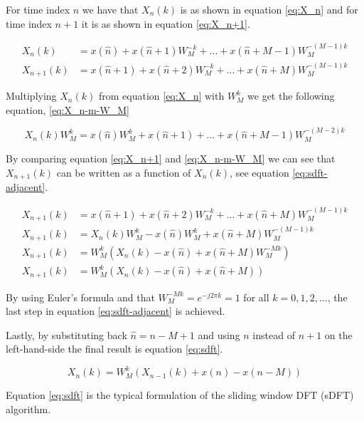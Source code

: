\documentclass[../main.tex]{subfiles}
\begin{document}
For time index $n$ we have that $X_n(k)$ is as shown in equation \eqref{eq:X_n} and for time index $n+1$ it is as shown in equation \eqref{eq:X_n+1}.

\begin{align}
    X_n(k) &= x(\hat{n}) + x(\hat{n}+1)W_M^{-k} + \ldots + x(\hat{n}+M-1)W_M^{-(M-1)k} \label{eq:X_n}\\
    X_{n+1}(k) &= x(\hat{n}+1) + x(\hat{n}+2)W_M^{-k} + \ldots + x(\hat{n}+M)W_M^{-(M-1)k} \label{eq:X_n+1}
\end{align}

Multiplying $X_n(k)$ from equation \eqref{eq:X_n} with $W_M^{k}$ we get the following equation, \eqref{eq:X_n-m-W_M}

\begin{equation}
    \label{eq:X_n-m-W_M}
    X_n(k)W_M^{k} = x(\hat{n})W_M^{k} + x(\hat{n}+1) + \ldots + x(\hat{n}+M-1)W_M^{-(M-2)k}
\end{equation}

By comparing equation \eqref{eq:X_n+1} and \eqref{eq:X_n-m-W_M} we can see that $X_{n+1}(k)$ can be written as a function of $X_n(k)$, see equation \eqref{eq:sdft-adjacent}.

\begin{align}
    X_{n+1}(k) &= x(\hat{n}+1) + x(\hat{n}+2)W_M^{-k} + \ldots + x(\hat{n}+M)W_M^{-(M-1)k} \nonumber\\
    X_{n+1}(k) &= X_n(k)W_M^{k} - x(\hat{n})W_M^{k} + x(\hat{n}+M)W_M^{-(M-1)k} \nonumber\\
    X_{n+1}(k) &= W_M^{k} ( X_n(k) - x(\hat{n}) + x(\hat{n}+M)W_M^{-Mk} ) \nonumber\\
    X_{n+1}(k) &= W_M^{k} ( X_n(k) - x(\hat{n}) + x(\hat{n}+M) ) \label{eq:sdft-adjacent}
\end{align}

By using Euler's formula and that $W_M^{-Mk} = e^{-j 2 \pi k} = 1$ for all $k = 0,1,2,\ldots$, the last step in equation \eqref{eq:sdft-adjacent} is achieved.

Lastly, by substituting back $\hat{n} = n - M + 1$ and using $n$ instead of $n+1$ on the left-hand-side the final result is equation \eqref{eq:sdft}.

\begin{equation}
    \label{eq:sdft}
    X_n(k) = W_M^{k} (X_{n-1}(k) + x(n) - x(n-M))
\end{equation}

Equation \eqref{eq:sdft} is the typical formulation of the sliding window DFT (sDFT) algorithm.
\end{document}
